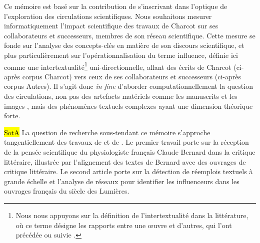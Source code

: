 Ce mémoire est basé sur la contribution de \citet{petkovic2023circulation} s'inscrivant dans l'optique de l'exploration des circulations scientifiques. Nous souhaitons mesurer informatiquement l'impact scientifique des travaux de Charcot sur ses collaborateurs et successeurs, membres de son réseau scientifique. Cette mesure se fonde sur l'analyse des concepts-clés en matière de son discours scientifique, et plus particulièrement sur l'opérationnalisation du terme \og{}influence\fg{}, définie ici comme une intertextualité\footnote{Nous nous appuyons sur la définition de l'intertextualité dans la littérature, où ce terme désigne les \og{}rapports entre une \oe{}uvre et d'autres, qui l'ont précédée ou suivie\fg{} \citep[p.~4]{riffaterre1980trace}.} uni-directionnelle, allant des écrits de Charcot (ci-après corpus \og{}Charcot\fg{}) vers ceux de ses collaborateurs et successeurs (ci-après corpus \og{}Autres\fg{}). Il s'agit donc \textit{in fine} d'aborder computationnellement la question des circulations, non pas des artefacts matériels comme les manuscrits \citep{gabay2021katabase} et les images \citep{joyeux2019visual}, mais des phénomènes textuels complexes \citep{manjavacas} ayant une dimension théorique forte. 

\hl{SotA} La question de recherche sous-tendant ce mémoire s'approche tangentiellement des travaux de \citet{riguet2018impact} et de \citet{roe2023enlightenment}. Le premier travail porte sur la réception de la pensée scientifique du physiologiste français Claude Bernard dans la critique littéraire, illustrée par l'alignement des textes de Bernard avec des ouvrages de critique littéraire. Le second article porte sur la détection de réemplois textuels à grande échelle et l'analyse de réseaux pour identifier les \og{}influenceurs\fg{} dans les ouvrages français du siècle des Lumières.


%
